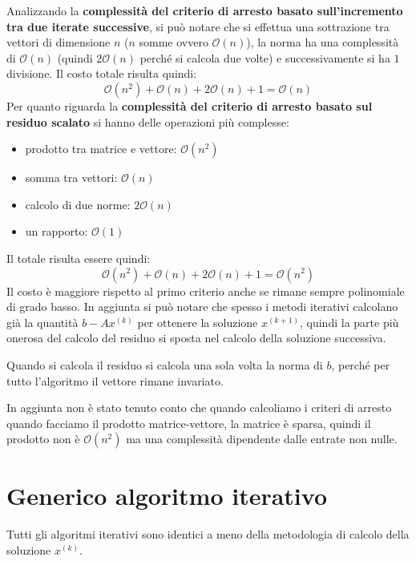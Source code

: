 Analizzando la \textbf{complessità del criterio di arresto basato sull'incremento
    tra due iterate successive}, si può notare che si effettua una sottrazione
tra vettori di dimensione $n$ ($n$ somme ovvero $\mathcal{O}(n)$), la norma ha
una complessità di $\mathcal{O}(n)$ (quindi $2\mathcal{O}(n)$ perché si calcola
due volte) e successivamente si ha $1$ divisione. Il costo totale risulta quindi:
\begin{equation*}
    \mathcal{O}(n^2)+ \mathcal{O}(n)+2\mathcal{O}(n)+1 = \mathcal{O}(n)
\end{equation*}
Per quanto riguarda la \textbf{complessità del criterio di arresto basato
    sul residuo scalato} si hanno delle operazioni più complesse:
\begin{itemize}
    \item prodotto tra matrice e vettore: $\mathcal{O}(n^2)$
    \item somma tra vettori: $\mathcal{O}(n)$
    \item calcolo di due norme: $2\mathcal{O}(n)$
    \item un rapporto: $\mathcal{O}(1)$
\end{itemize}
Il totale risulta essere quindi:
\begin{equation*}
    \mathcal{O}(n^2)+ \mathcal{O}(n)+2\mathcal{O}(n)+1 = \mathcal{O}(n^2)
\end{equation*}
Il costo è maggiore rispetto al primo criterio anche se rimane sempre polinomiale
di grado basso. In aggiunta si può notare che spesso i metodi iterativi calcolano
già la quantità $b-Ax^{(k)}$ per ottenere la soluzione $x^{(k+1)}$, quindi la parte
più onerosa del calcolo del residuo si sposta nel calcolo della soluzione successiva.
\begin{nota}
    Quando si calcola il residuo si calcola una sola volta la norma di $b$, perché
    per tutto l'algoritmo il vettore rimane invariato.
\end{nota}
\begin{nota}
    In aggiunta non è stato tenuto conto che quando calcoliamo i criteri di arresto
    quando facciamo il prodotto matrice-vettore, la matrice è sparsa, quindi
    il prodotto non è $\mathcal{O}(n^2)$ ma una complessità dipendente dalle entrate
    non nulle.
\end{nota}
\section{Generico algoritmo iterativo}
Tutti gli algoritmi iterativi sono identici a meno della metodologia di calcolo
della soluzione $x^{(k)}$.

